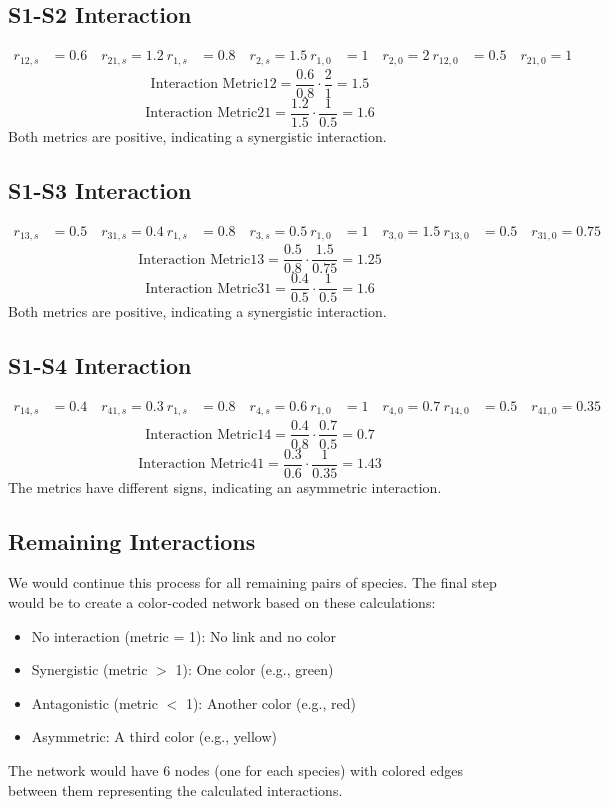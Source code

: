 \documentclass{article}
\begin{document}
\subsection*{S1-S2 Interaction}
\begin{align*}
r_{12,s} &= 0.6 \quad r_{21,s} = 1.2 \
r_{1,s} &= 0.8 \quad r_{2,s} = 1.5 \
r_{1,0} &= 1 \quad r_{2,0} = 2 \
r_{12,0} &= 0.5 \quad r_{21,0} = 1
\end{align*}
\[ \text{Interaction Metric}{12} = \frac{0.6}{0.8} \cdot \frac{2}{1} = 1.5 \]
\[ \text{Interaction Metric}{21} = \frac{1.2}{1.5} \cdot \frac{1}{0.5} = 1.6 \]
Both metrics are positive, indicating a synergistic interaction.
\subsection*{S1-S3 Interaction}
\begin{align*}
r_{13,s} &= 0.5 \quad r_{31,s} = 0.4 \
r_{1,s} &= 0.8 \quad r_{3,s} = 0.5 \
r_{1,0} &= 1 \quad r_{3,0} = 1.5 \
r_{13,0} &= 0.5 \quad r_{31,0} = 0.75
\end{align*}
\[ \text{Interaction Metric}{13} = \frac{0.5}{0.8} \cdot \frac{1.5}{0.75} = 1.25 \]
\[ \text{Interaction Metric}{31} = \frac{0.4}{0.5} \cdot \frac{1}{0.5} = 1.6 \]
Both metrics are positive, indicating a synergistic interaction.
\subsection*{S1-S4 Interaction}
\begin{align*}
r_{14,s} &= 0.4 \quad r_{41,s} = 0.3 \
r_{1,s} &= 0.8 \quad r_{4,s} = 0.6 \
r_{1,0} &= 1 \quad r_{4,0} = 0.7 \
r_{14,0} &= 0.5 \quad r_{41,0} = 0.35
\end{align*}
\[ \text{Interaction Metric}{14} = \frac{0.4}{0.8} \cdot \frac{0.7}{0.5} = 0.7 \]
\[ \text{Interaction Metric}{41} = \frac{0.3}{0.6} \cdot \frac{1}{0.35} = 1.43 \]
The metrics have different signs, indicating an asymmetric interaction.
\subsection*{Remaining Interactions}
We would continue this process for all remaining pairs of species. The final step would be to create a color-coded network based on these calculations:
\begin{itemize}
\item No interaction (metric = 1): No link and no color
\item Synergistic (metric $>$ 1): One color (e.g., green)
\item Antagonistic (metric $<$ 1): Another color (e.g., red)
\item Asymmetric: A third color (e.g., yellow)
\end{itemize}
The network would have 6 nodes (one for each species) with colored edges between them representing the calculated interactions.
\end{document}
